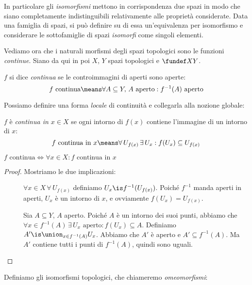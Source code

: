 In particolare gli \emph{isomorfismi} mettono in corrispondenza due spazi in modo che siano completamente indistinguibili relativamente alle proprietà considerate. Data una famiglia di spazi, si può definire su di essa un'equivalenza per isomorfismo e considerare le sottofamiglie di spazi \emph{isomorfi} come singoli elementi.

Vediamo ora che i naturali morfismi degli spazi topologici sono le funzioni \emph{continue}. Siano da qui in poi $X$, $Y$ spazi topologici e $\fundef XY$.

\begin{defn}[Continuità]
	$f$ si dice \emph{continua} se le controimmagini di aperti sono aperte:
	\[f\text{ continua}\means
	\forall A\subseteq Y,\,A\text{ aperto}:f^{-1}(A)\text{ aperto}\]
\end{defn}

Possiamo definire una forma \emph{locale} di continuità e collegarla alla nozione globale:

\begin{defn}
	$f$ è \emph{continua in $x\in X$} se ogni intorno di $f(x)$ contiene l'immagine di un intorno di $x$:
	\[f\text{ continua in }x\means
	\forall\, U_{f(x)}\,\exists\, U_x:f(U_x)\subseteq U_{f(x)}\]
\end{defn}

\begin{prop}
	$f\text{ continua}\iff\forall x\in X:f\text{ continua in }x$
\end{prop}

\begin{proof}
	Mostriamo le due implicazioni:
	\begin{description}
		\item[\proofrightarrow]
			$\forall x\in X\,\forall\,U_{f(x)}$ definiamo $U_x\is f^{-1}(U_{f(x)})$.
			Poiché $f^{-1}$ manda aperti in aperti, $U_x$ è un intorno di $x$,
			e ovviamente $f(U_x)=U_{f(x)}$.
		\item[\proofleftarrow]
			Sia  $A\subseteq Y$, $A$ aperto.
			Poiché $A$ è un intorno dei suoi punti, abbiamo che
			$\forall x\in f^{-1}(A)\,\exists\,U_x\text{ aperto}:f(U_x)\subseteq A$.
			Definiamo $A'\is\union_{x\in f^{-1}(A)}U_x$.
			Abbiamo che $A'$ è aperto e $A'\subseteq f^{-1}(A)$.
			Ma $A'$ contiene tutti i punti di $f^{-1}(A)$, quindi sono uguali.
			\qedhere
	\end{description}
\end{proof}

Definiamo gli isomorfismi topologici, che chiameremo \emph{omeomorfismi}:

